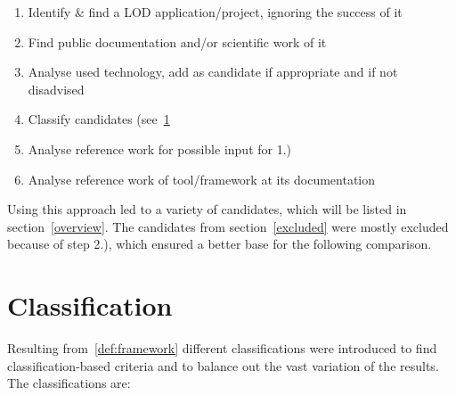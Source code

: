 \begin{enumerate}
\item Identify \& find a LOD application/project, ignoring the success of it
\item Find public documentation and/or scientific work of it
\item Analyse used technology, add as candidate if appropriate and if not disadvised
\item Classify candidates (see~\ref{classification}
\item Analyse reference work for possible input for 1.)
\item Analyse reference work of tool/framework at its documentation
\end{enumerate}

Using this approach led to a variety of candidates, which will be listed in section~\ref{overview}. The candidates from section~\ref{excluded} were mostly excluded because of step 2.), which ensured a better base for the following comparison.

\section{Classification}\label{classification}
Resulting from~\ref{def:framework} different classifications were introduced to find classification-based criteria and to balance out the vast variation of the results. The classifications are:

